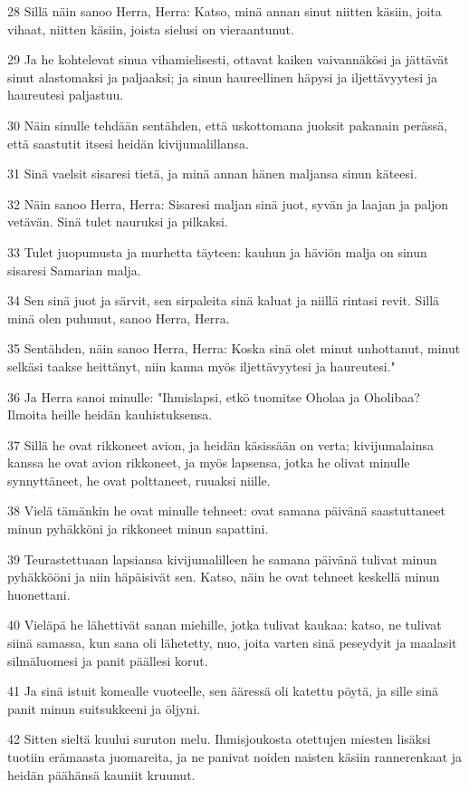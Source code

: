 \par 28 Sillä näin sanoo Herra, Herra: Katso, minä annan sinut niitten käsiin, joita vihaat, niitten käsiin, joista sielusi on vieraantunut.
\par 29 Ja he kohtelevat sinua vihamielisesti, ottavat kaiken vaivannäkösi ja jättävät sinut alastomaksi ja paljaaksi; ja sinun haureellinen häpysi ja iljettävyytesi ja haureutesi paljastuu.
\par 30 Näin sinulle tehdään sentähden, että uskottomana juoksit pakanain perässä, että saastutit itsesi heidän kivijumalillansa.
\par 31 Sinä vaelsit sisaresi tietä, ja minä annan hänen maljansa sinun käteesi.
\par 32 Näin sanoo Herra, Herra: Sisaresi maljan sinä juot, syvän ja laajan ja paljon vetävän. Sinä tulet nauruksi ja pilkaksi.
\par 33 Tulet juopumusta ja murhetta täyteen: kauhun ja häviön malja on sinun sisaresi Samarian malja.
\par 34 Sen sinä juot ja särvit, sen sirpaleita sinä kaluat ja niillä rintasi revit. Sillä minä olen puhunut, sanoo Herra, Herra.
\par 35 Sentähden, näin sanoo Herra, Herra: Koska sinä olet minut unhottanut, minut selkäsi taakse heittänyt, niin kanna myös iljettävyytesi ja haureutesi."
\par 36 Ja Herra sanoi minulle: "Ihmislapsi, etkö tuomitse Oholaa ja Oholibaa? Ilmoita heille heidän kauhistuksensa.
\par 37 Sillä he ovat rikkoneet avion, ja heidän käsissään on verta; kivijumalainsa kanssa he ovat avion rikkoneet, ja myös lapsensa, jotka he olivat minulle synnyttäneet, he ovat polttaneet, ruuaksi niille.
\par 38 Vielä tämänkin he ovat minulle tehneet: ovat samana päivänä saastuttaneet minun pyhäkköni ja rikkoneet minun sapattini.
\par 39 Teurastettuaan lapsiansa kivijumalilleen he samana päivänä tulivat minun pyhäkkööni ja niin häpäisivät sen. Katso, näin he ovat tehneet keskellä minun huonettani.
\par 40 Vieläpä he lähettivät sanan miehille, jotka tulivat kaukaa: katso, ne tulivat siinä samassa, kun sana oli lähetetty, nuo, joita varten sinä peseydyit ja maalasit silmäluomesi ja panit päällesi korut.
\par 41 Ja sinä istuit komealle vuoteelle, sen ääressä oli katettu pöytä, ja sille sinä panit minun suitsukkeeni ja öljyni.
\par 42 Sitten sieltä kuului suruton melu. Ihmisjoukosta otettujen miesten lisäksi tuotiin erämaasta juomareita, ja ne panivat noiden naisten käsiin rannerenkaat ja heidän päähänsä kauniit kruunut.

